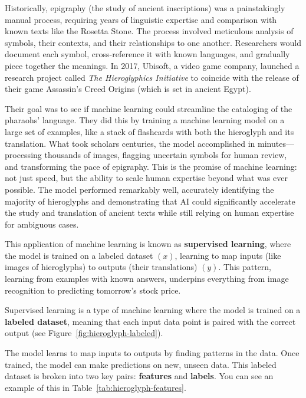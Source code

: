 Historically, epigraphy (the study of ancient inscriptions) was a painstakingly manual process, requiring years of linguistic expertise and comparison with known texts like the Rosetta Stone.
The process involved meticulous analysis of symbols, their contexts, and their relationships to one another.
Researchers would document each symbol, cross-reference it with known languages, and gradually piece together the meanings.
In 2017, Ubisoft, a video game company, launched a research project called \textit{The Hieroglyphics Initiative} to coincide with the release of their game Assassin's Creed Origins (which is set in ancient Egypt).

Their goal was to see if machine learning could streamline the cataloging of the pharaohs' language.
They did this by training a machine learning model on a large set of examples, like a stack of flashcards with both the hieroglyph and its translation.
What took scholars centuries, the model accomplished in minutes---processing thousands of images, flagging uncertain symbols for human review, and transforming the pace of epigraphy.
This is the promise of machine learning: not just speed, but the ability to scale human expertise beyond what was ever possible.
The model performed remarkably well, accurately identifying the majority of hieroglyphs and demonstrating that AI could significantly accelerate the study and translation of ancient texts while still relying on human expertise for ambiguous cases.

This application of machine learning is known as \textbf{supervised learning}, where the model is trained on a labeled dataset $(x)$, learning to map inputs (like images of hieroglyphs) to outputs (their translations) $(y)$. 
This pattern, learning from examples with known answers, underpins everything from image recognition to predicting tomorrow's stock price.

Supervised learning is a type of machine learning where the model is trained on a \textbf{labeled dataset}, meaning that each input data point is paired with the correct output (see Figure~\ref{fig:hieroglyph-labeled}). 



The model learns to map inputs to outputs by finding patterns in the data. Once trained, the model can make predictions on new, unseen data. 
This labeled dataset is broken into two key pairs: \textbf{features} and \textbf{labels}. You can see an example of this in Table~\ref{tab:hieroglyph-features}.

